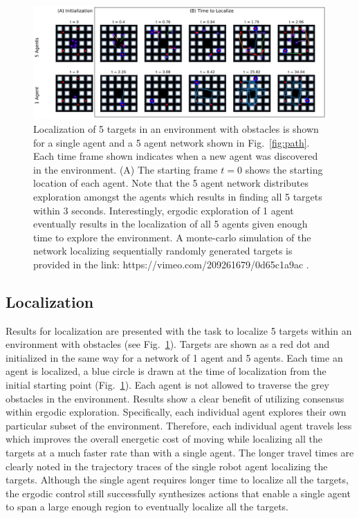 \documentclass[conference]{IEEEtran}
\begin{document}
\begin{figure}[th!]
\centering
\includegraphics[scale=0.9]{figures/distr_loc2.eps}
\caption{ Localization of 5 targets in an environment with obstacles is shown for a single agent and a 5 agent network shown in Fig.~\ref{fig:path}. Each time frame shown indicates when a new agent was discovered in the environment. (A) The starting frame $t=0$ shows the starting location of each agent. Note that the 5 agent network distributes exploration amongst the agents which results in finding all 5 targets within $3$ seconds. Interestingly, ergodic exploration of 1 agent eventually results in the localization of all 5 agents given enough time to explore the environment. A monte-carlo simulation of the network localizing sequentially randomly generated targets is provided in the link: https://vimeo.com/209261679/0d65c1a9ac .}
\label{fig:disloc}
\end{figure}

\subsection{Localization}

Results for localization are presented with the task to localize 5 targets within an environment with obstacles (see Fig.~\ref{fig:disloc}). Targets are shown as a red dot and initialized in the same way for a network of 1 agent and 5 agents. Each time an agent is localized, a blue circle is drawn at the time of localization from the initial starting point (Fig.~\ref{fig:disloc}). Each agent is not allowed to traverse the grey obstacles in the environment. Results show a clear benefit of utilizing consensus within ergodic exploration. Specifically, each individual agent explores their own particular subset of the environment. Therefore, each individual agent travels less which improves the overall energetic cost of moving while localizing all the targets at a much faster rate than with a single agent. The longer travel times are clearly noted in the trajectory traces of the single robot agent localizing the targets. Although the single agent requires longer time to localize all the targets, the ergodic control still successfully synthesizes actions that enable a single agent to span a large enough region to eventually localize all the targets.
\end{document}
